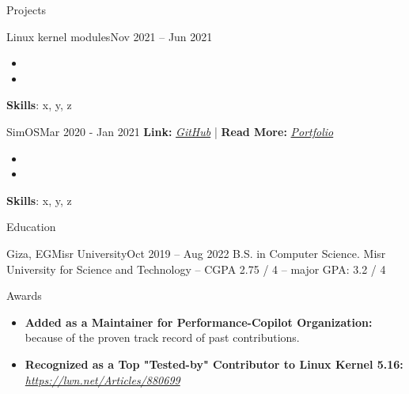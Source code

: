 \documentclass[]{Sohaib-Mohamed}
\begin{document}
\begin{cvsection}{Projects}
\begin{cvsubsection}{Linux kernel modules}{}{Nov 2021 -- Jun 2021}
\begin{itemize}
         \item
         \item
      \end{itemize}
      \textbf{Skills}: x, y, z
   \end{cvsubsection}
   \begin{cvsubsection}{SimOS}{}{Mar 2020 - Jan 2021}
      \textbf{Link:} \href{https://github.com/smalinux/simOS}{\textit{GitHub}} | \textbf{Read More:} \href{https://gist.github.com/smalinux/2e9c5537fdac65501a655280352c9c15#simos}{\textit{Portfolio}}
      \begin{itemize}
         \item
         \item
      \end{itemize}
      \textbf{Skills}: x, y, z
   \end{cvsubsection}
\end{cvsection}

\begin{cvsection}{Education}
   \begin{cvsubsection}{Giza, EG}{Misr University}{Oct 2019 -- Aug 2022}
      B.S. in Computer Science. Misr University for Science and Technology -- CGPA 2.75 / 4 -- major GPA: 3.2 / 4
   \end{cvsubsection}
\end{cvsection}

\begin{cvsection}{Awards}
   \begin{cvsubsection}{}{}{}
      \begin{itemize}
         \item \textbf{Added as a Maintainer for Performance-Copilot Organization:} because of the proven track record of past contributions.
         \item \textbf{Recognized as a Top "Tested-by" Contributor to Linux Kernel 5.16:} \href{https://lwn.net/Articles/880699/}{\textit{https://lwn.net/Articles/880699}}
      \end{itemize}
   \end{cvsubsection}
\end{cvsection}
\end{document}
